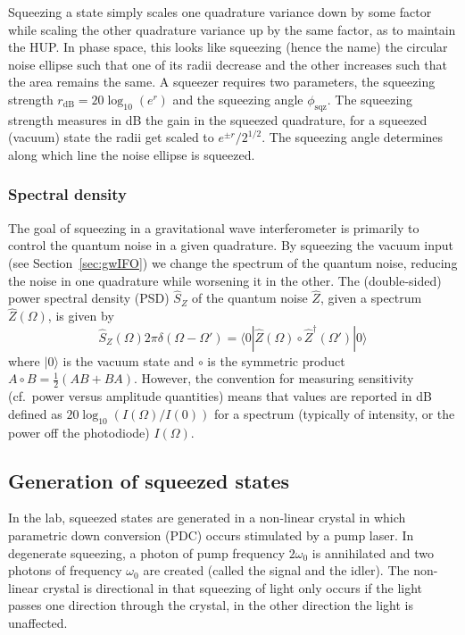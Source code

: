 \documentclass[aps,pra,superscriptaddress,reprint,nofootinbib]{revtex4-1}
\begin{document}
Squeezing a state simply scales one quadrature variance down by some factor while scaling the other quadrature variance up by the same factor, as to maintain the HUP. In phase space, this looks like squeezing (hence the name) the circular noise ellipse such that one of its radii decrease and the other increases such that the area remains the same. A squeezer requires two parameters, the squeezing strength $r_{\mathrm{dB}} = 20 \log_{10}(e^r)$ and the squeezing angle $\phi_{\mathrm{sqz}}$. The squeezing strength measures in dB the gain in the squeezed quadrature, for a squeezed (vacuum) state the radii get scaled to $e^{\pm r}/2^{1/2}$. The squeezing angle determines along which line the noise ellipse is squeezed.

\subsubsection{Spectral density}

The goal of squeezing in a gravitational wave interferometer is primarily to control the quantum noise in a given quadrature. By squeezing the vacuum input (see Section~\ref{sec:gwIFO}) we change the spectrum of the quantum noise, reducing the noise in one quadrature while worsening it in the other. The (double-sided) power spectral density (PSD) $\hat{S}_Z$ of the quantum noise $\hat{Z}$, given a spectrum $\hat{Z}(\Omega)$, is given by $$\hat{S}_Z(\Omega) 2 \pi \delta(\Omega - \Omega') = \langle0| \hat{Z}(\Omega) \circ \hat{Z}^\dagger(\Omega') |0\rangle$$ where $|0\rangle$ is the vacuum state and $\circ$ is the symmetric product $A \circ B = \frac{1}{2}(A B + B A)$. However, the convention for measuring sensitivity (cf.\ power versus amplitude quantities) means that values are reported in dB defined as $20 \log_{10}(I(\Omega)/I(0))$ for a spectrum (typically of intensity, or the power off the photodiode) $I(\Omega)$.


\subsection{Generation of squeezed states}

In the lab, squeezed states are generated in a non-linear crystal in which parametric down conversion (PDC) occurs stimulated by a pump laser. In degenerate squeezing, a photon of pump frequency $2\omega_0$ is annihilated and two photons of frequency $\omega_0$ are created (called the signal and the idler). The non-linear crystal is directional in that squeezing of light only occurs if the light passes one direction through the crystal, in the other direction the light is unaffected.
\end{document}
